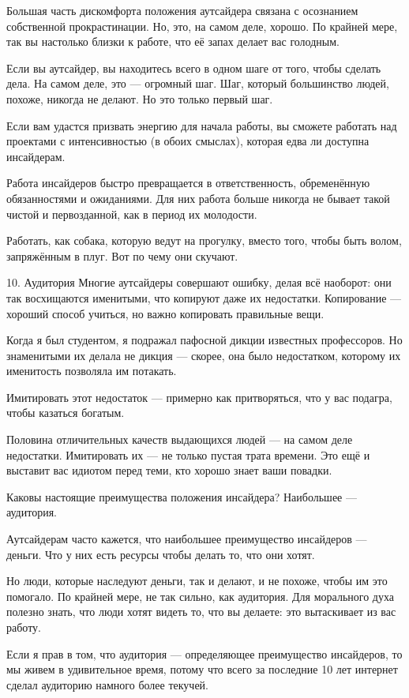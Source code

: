 \documentclass[ebook,12pt,oneside,openany]{memoir}
\begin{document}
Большая часть дискомфорта положения аутсайдера связана с осознанием
собственной прокрастинации. Но, это, на самом деле, хорошо. По крайней
мере, так вы настолько близки к работе, что её запах делает вас
голодным.

Если вы аутсайдер, вы находитесь всего в одном шаге от того, чтобы
сделать дела. На самом деле, это — огромный шаг. Шаг, который
большинство людей, похоже, никогда не делают. Но это только первый
шаг.

Если вам удастся призвать энергию для начала работы, вы сможете
работать над проектами с интенсивностью (в обоих смыслах), которая
едва ли доступна инсайдерам.

Работа инсайдеров быстро превращается в ответственность, обременённую
обязанностями и ожиданиями. Для них работа больше никогда не бывает
такой чистой и первозданной, как в период их молодости.

Работать, как собака, которую ведут на прогулку, вместо того, чтобы
быть волом, запряжённым в плуг. Вот по чему они скучают.

10. Аудитория Многие аутсайдеры совершают ошибку, делая всё наоборот:
они так восхищаются именитыми, что копируют даже их недостатки.
Копирование — хороший способ учиться, но важно копировать правильные
вещи.

Когда я был студентом, я подражал пафосной дикции известных
профессоров. Но знаменитыми их делала не дикция — скорее, она было
недостатком, которому их именитость позволяла им потакать.

Имитировать этот недостаток — примерно как притворяться, что у вас
подагра, чтобы казаться богатым.

Половина отличительных качеств выдающихся людей — на самом деле
недостатки. Имитировать их — не только пустая трата времени. Это ещё и
выставит вас идиотом перед теми, кто хорошо знает ваши повадки.

Каковы настоящие преимущества положения инсайдера? Наибольшее —
аудитория.

Аутсайдерам часто кажется, что наибольшее преимущество инсайдеров —
деньги. Что у них есть ресурсы чтобы делать то, что они хотят.

Но люди, которые наследуют деньги, так и делают, и не похоже, чтобы им
это помогало. По крайней мере, не так сильно, как аудитория. Для
морального духа полезно знать, что люди хотят видеть то, что вы
делаете: это вытаскивает из вас работу.

Если я прав в том, что аудитория — определяющее преимущество
инсайдеров, то мы живем в удивительное время, потому что всего за
последние 10 лет интернет сделал аудиторию намного более текучей.
\end{document}
